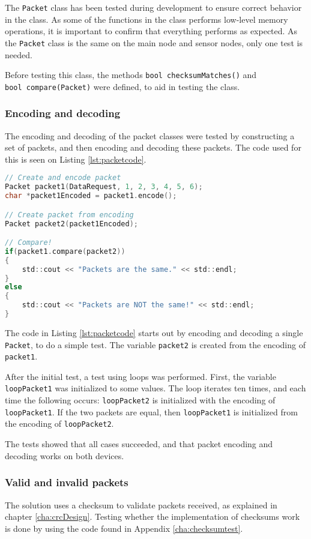 The \texttt{Packet} class has been tested during development to ensure correct behavior in the class. As some of the functions in the class performs low-level memory operations, it is important to confirm that everything performs as expected. As the \texttt{Packet} class is the same on the main node and sensor nodes, only one test is needed.

Before testing this class, the methods \texttt{bool checksumMatches()} and \\ \texttt{bool compare(Packet)} were defined, to aid in testing the class.

\subsubsection*{Encoding and decoding}
The encoding and decoding of the packet classes were tested by constructing a set of packets, and then encoding and decoding these packets. The code used for this is seen on Listing \ref{lst:packetcode}.

\begin{lstlisting}[language=C,label={lst:packetcode},caption={Testing packet encoding/decoding.}]
// Create and encode packet
Packet packet1(DataRequest, 1, 2, 3, 4, 5, 6);
char *packet1Encoded = packet1.encode();

// Create packet from encoding
Packet packet2(packet1Encoded);

// Compare!
if(packet1.compare(packet2))
{
    std::cout << "Packets are the same." << std::endl;
}
else
{
    std::cout << "Packets are NOT the same!" << std::endl;
}
\end{lstlisting}
The code in Listing \ref{lst:packetcode} starts out by encoding and decoding a single \texttt{Packet}, to do a simple test. The variable \texttt{packet2} is created from the encoding of \texttt{packet1}. 

After the initial test, a test using loops was performed. First, the variable  \texttt{loopPacket1} was initialized to some values. The loop iterates ten times, and each time the following occurs: \texttt{loopPacket2} is initialized with the encoding of \texttt{loopPacket1}. If the two packets are equal, then \texttt{loopPacket1} is initialized from the encoding of \texttt{loopPacket2}. 

The tests showed that all cases succeeded, and that packet encoding and decoding works on both devices.

\subsubsection*{Valid and invalid packets}
The solution uses a checksum to validate packets received, as explained in chapter \ref{cha:crcDesign}. Testing whether the implementation of checksums work is done by using the code found in Appendix \ref{cha:checksumtest}.


